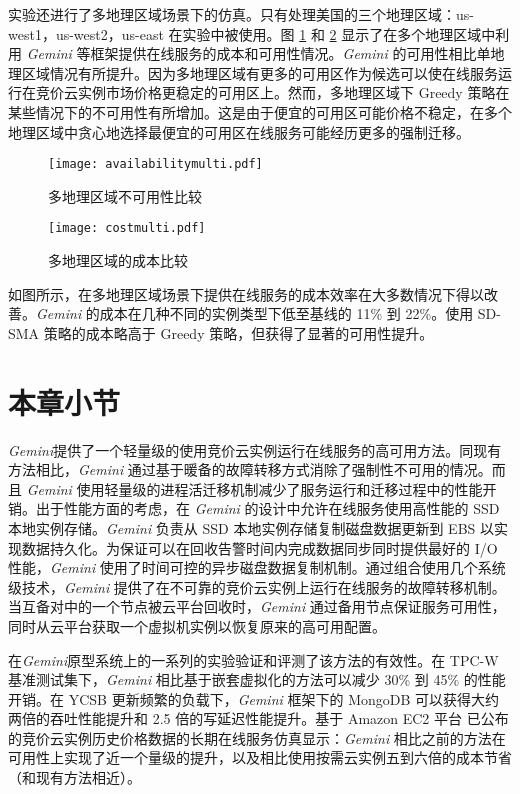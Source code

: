 实验还进行了多地理区域场景下的仿真。只有处理美国的三个地理区域：us-west1，us-west2，us-east 在实验中被使用。图 \ref{figure:unavailabilitymulti} 和 \ref{figure:costmulti} 显示了在多个地理区域中利用 \emph{Gemini} 等框架提供在线服务的成本和可用性情况。\emph{Gemini} 的可用性相比单地理区域情况有所提升。因为多地理区域有更多的可用区作为候选可以使在线服务运行在竞价云实例市场价格更稳定的可用区上。然而，多地理区域下 Greedy 策略在某些情况下的不可用性有所增加。这是由于便宜的可用区可能价格不稳定，在多个地理区域中贪心地选择最便宜的可用区在线服务可能经历更多的强制迁移。
\begin{figure}[]
  \centering
  \texttt{[image: availabilitymulti.pdf]}
  \caption{多地理区域不可用性比较}
  \label{figure:unavailabilitymulti}
\end{figure}

\begin{figure}[]
  \centering
  \texttt{[image: costmulti.pdf]}
  \caption{多地理区域的成本比较}
  \label{figure:costmulti}
\end{figure}

如图所示，在多地理区域场景下提供在线服务的成本效率在大多数情况下得以改善。\emph{Gemini} 的成本在几种不同的实例类型下低至基线的 11\% 到 22\%。使用 SD-SMA 策略的成本略高于 Greedy 策略，但获得了显著的可用性提升。

\section{本章小节}
\emph{Gemini}提供了一个轻量级的使用竞价云实例运行在线服务的高可用方法。同现有方法相比，\emph{Gemini} 通过基于暖备的故障转移方式消除了强制性不可用的情况。而且 \emph{Gemini} 使用轻量级的进程活迁移机制减少了服务运行和迁移过程中的性能开销。出于性能方面的考虑，在 \emph{Gemini} 的设计中允许在线服务使用高性能的 SSD 本地实例存储。\emph{Gemini} 负责从 SSD 本地实例存储复制磁盘数据更新到 EBS 以实现数据持久化。为保证可以在回收告警时间内完成数据同步同时提供最好的 I/O 性能，\emph{Gemini} 使用了时间可控的异步磁盘数据复制机制。通过组合使用几个系统级技术，\emph{Gemini} 提供了在不可靠的竞价云实例上运行在线服务的故障转移机制。当互备对中的一个节点被云平台回收时，\emph{Gemini} 通过备用节点保证服务可用性，同时从云平台获取一个虚拟机实例以恢复原来的高可用配置。

在\emph{Gemini}原型系统上的一系列的实验验证和评测了该方法的有效性。在 TPC-W 基准测试集下，\emph{Gemini} 相比基于嵌套虚拟化的方法可以减少 30\% 到 45\% 的性能开销。在 YCSB 更新频繁的负载下，\emph{Gemini} 框架下的 MongoDB 可以获得大约两倍的吞吐性能提升和 2.5 倍的写延迟性能提升。基于 Amazon EC2 平台 已公布的竞价云实例历史价格数据的长期在线服务仿真显示：\emph{Gemini} 相比之前的方法在可用性上实现了近一个量级的提升，以及相比使用按需云实例五到六倍的成本节省（和现有方法相近）。
